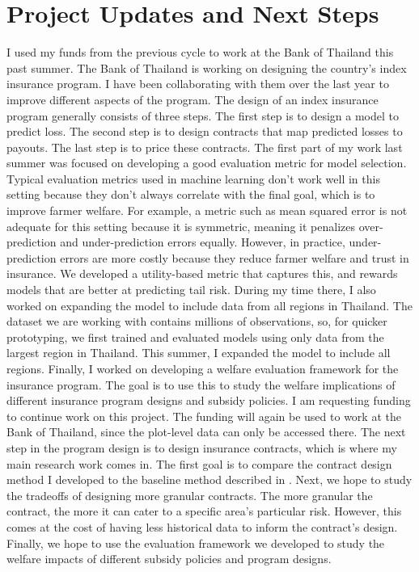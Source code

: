 \documentclass[12pt]{article}
\begin{document}
\section*{Project Updates and Next Steps}
I used my funds from the previous cycle to work at the Bank of Thailand this past summer. The Bank of Thailand is working on designing the country's index insurance program. I have been collaborating with them over the last year to improve different aspects of the program. The design of an index insurance program generally consists of three steps. The first step is to design a model to predict loss. The second step is to design contracts that map predicted losses to payouts. The last step is to price these contracts. The first part of my work last summer was focused on developing a good evaluation metric for model selection. Typical evaluation metrics used in machine learning don't work well in this setting because they don't always correlate with the final goal, which is to improve farmer welfare. For example, a metric such as mean squared error is not adequate for this setting because it is symmetric, meaning it penalizes over-prediction and under-prediction errors equally. However, in practice, under-prediction errors are more costly because they reduce farmer welfare and trust in insurance. We developed a utility-based metric that captures this, and rewards models that are better at predicting tail risk. During my time there, I also worked on expanding the model to include data from all regions in Thailand. The dataset we are working with contains millions of observations, so, for quicker prototyping, we first trained and evaluated models using only data from the largest region in Thailand. This summer, I expanded the model to include all regions. Finally, I worked on developing a welfare evaluation framework for the insurance program. The goal is to use this to study the welfare implications of different insurance program designs and subsidy policies. I am requesting funding to continue work on this project. The funding will again be used to work at the Bank of Thailand, since the plot-level data can only be accessed there. The next step in the program design is to design insurance contracts, which is where my main research work comes in. The first goal is to compare the contract design method I developed to the baseline method described in \cite{chantarat2013designing}. Next, we hope to study the tradeoffs of designing more granular contracts. The more granular the contract, the more it can cater to a specific area's particular risk. However, this comes at the cost of having less historical data to inform the contract's design. Finally, we hope to use the evaluation framework we developed to study the welfare impacts of different subsidy policies and program designs. 
\end{document}
